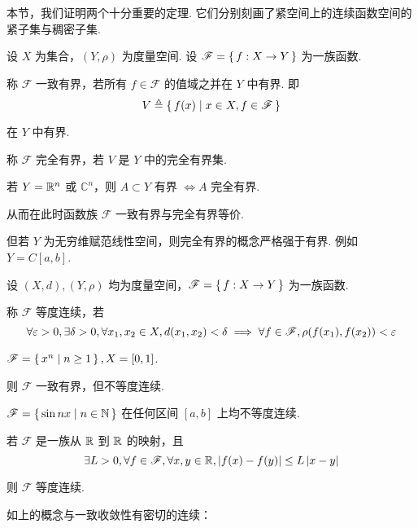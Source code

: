 本节，我们证明两个十分重要的定理. 它们分别刻画了紧空间上的连续函数空间的紧子集与稠密子集.


\begin{definition}
    设 $X$ 为集合，$(Y,\rho)$ 为度量空间. 设 $\mathscr{F}=\set{f:X\to Y}$ 为一族函数.

    称 $\mathscr{F}$ 一致有界，若所有 $f\in\mathscr{F}$ 的值域之并在 $Y$ 中有界. 即
$$
V\triangleq\set{f(x)|x\in X,f\in\mathscr{F}}
$$

    在 $Y$ 中有界.

    称 $\mathscr{F}$ 完全有界，若 $V$ 是 $Y$ 中的完全有界集.
\end{definition}

\begin{hint}
    若 $Y=\mathbb{R}^n$ 或 $\mathbb{C}^n$，则 $A\subset Y$ 有界 $\iff A$ 完全有界.

    从而在此时函数族 $\mathscr{F}$ 一致有界与完全有界等价.

    但若 $Y$ 为无穷维赋范线性空间，则完全有界的概念严格强于有界. 例如 $Y=C[a,b]$.
\end{hint}

\begin{definition}
    设 $(X,d),(Y,\rho)$ 均为度量空间，$\mathscr{F}=\set{f:X\to Y}$ 为一族函数.

    称 $\mathscr{F}$ 等度连续，若
$$
\forall\varepsilon>0,\exists\delta>0,\forall x_1,x_2\in X,d(x_1,x_2)<\delta\implies\forall f\in\mathscr{F},\rho(f(x_1),f(x_2))<\varepsilon
$$
\end{definition}

\begin{example}
    $\mathscr{F}=\set{x^n|n\ge 1},X=[0,1]$.

    则 $\mathscr{F}$ 一致有界，但不等度连续.
\end{example}

\begin{example}
    $\mathscr{F}=\set{\sin nx|n\in\mathbb{N}}$ 在任何区间 $[a,b]$ 上均不等度连续.
\end{example}

\begin{example}
    若 $\mathscr{F}$ 是一族从 $\mathbb{R}$ 到 $\mathbb{R}$ 的映射，且
$$
\exists L>0,\forall f\in\mathscr{F},\forall x,y\in\mathbb{R},\left\lvert{f(x)-f(y)}\right\rvert\le L\left\lvert{x-y}\right\rvert
$$

    则 $\mathscr{F}$ 等度连续.
\end{example}

如上的概念与一致收敛性有密切的连续：

